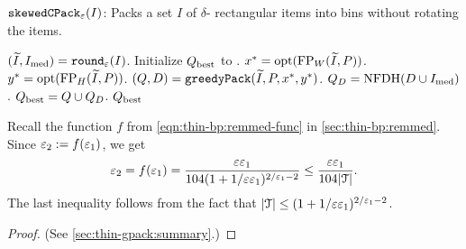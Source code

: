 \begin{algorithm}[htb]
\caption{$\operatorname{\mathtt{skewedCPack}}_{\varepsilon}(I)$: Packs a set $I$ of $\delta$-\thin{} rectangular items
into bins without rotating the items.}
\label{algo:thinCPack}
\begin{algorithmic}[1]
\State $(\widetilde{I}, I_{\mathrm{med}}) = \operatorname{\mathtt{round}}_{\varepsilon}(I)$.
\State Initialize $Q_{\mathrm{best}}$ to \Null.
    \State $x^* = \operatorname{opt}(\operatorname{FP}_W(\widetilde{I}, P))$.
    \State $y^* = \operatorname{opt}(\operatorname{FP}_H(\widetilde{I}, P))$.
        \State $(Q, D) = \operatorname{\mathtt{greedyPack}}(\widetilde{I}, P, x^*, y^*)$.
        \State $Q_D = \operatorname{NFDH}(D \cup I_{\mathrm{med}})$.
            \State $Q_{\mathrm{best}} = Q \cup Q_D$.
        \EndIf
    \EndIf
\EndFor
\State \Return $Q_{\mathrm{best}}$
\end{algorithmic}
\end{algorithm}

Recall the function $f$ from \cref{eqn:thin-bp:remmed-func} in \cref{sec:thin-bp:remmed}.
Since $\varepsilon_2 := f(\varepsilon_1)$, we get
\begin{equation}
\label{eqn:epsSmall}
\varepsilon_2 = f(\varepsilon_1)
= \frac{\varepsilon\varepsilon_1}{104(1+1/\varepsilon\varepsilon_1)^{2/\varepsilon_1-2}}
\le \frac{\varepsilon\varepsilon_1}{104|\mathcal{T}|}.
\end{equation}
The last inequality follows from the fact that
$|\mathcal{T}| \le (1+1/\varepsilon\varepsilon_1)^{2/\varepsilon_1-2}$.

\rthmNfdhWide*
\begin{proof}(See \cref{sec:thin-gpack:summary}.)\end{proof}

